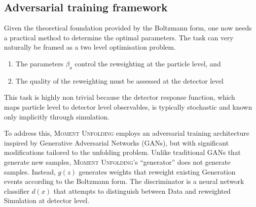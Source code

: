     \subsection{Adversarial training framework}
        Given the theoretical foundation provided by the Boltzmann form, one now needs a practical method to determine the optimal parameters.
        The task can very naturally be framed as a two level optimisation problem.
        \begin{enumerate}
            \item The parameters $\beta_a$ control the reweighting at the particle level, and
            \item The quality of the reweighting must be assessed at the detector level
        \end{enumerate}
        This task is highly non trivial because the detector response function, which maps particle level to detector level observables, is typically stochastic and known only implicitly through simulation.
    
        To address this, \textsc{Moment Unfolding} employs an adversarial training architecture inspired by Generative Adversarial Networks (GANs), but with significant modifications tailored to the unfolding problem.
        Unlike traditional GANs that generate new samples, \textsc{Moment Unfolding}'s ``generator'' does not generate samples.
        Instead, $g(z)$ generates weights that reweight existing Generation events according to the Boltzmann form.
        The discriminator is a neural network classifier $d(x)$ that attempts to distinguish between Data and reweighted Simulation at detector level.

